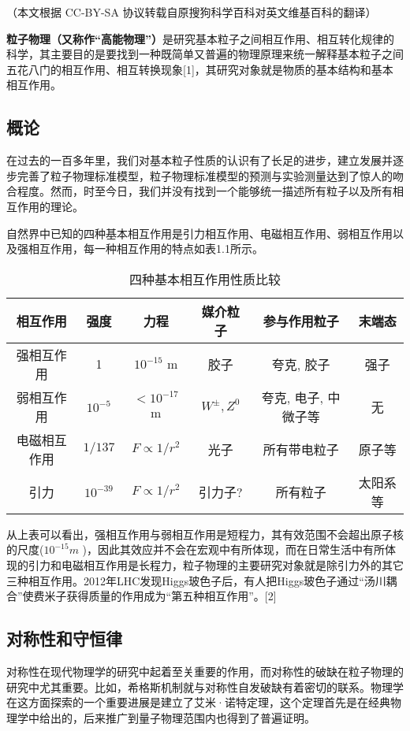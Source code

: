 
（本文根据 CC-BY-SA 协议转载自原搜狗科学百科对英文维基百科的翻译）


\textbf{粒子物理（又称作“高能物理”）}是研究基本粒子之间相互作用、相互转化规律的科学，其主要目的是要找到一种既简单又普遍的物理原理来统一解释基本粒子之间五花八门的相互作用、相互转换现象[1]，其研究对象就是物质的基本结构和基本相互作用。

\subsection{概论}
在过去的一百多年里，我们对基本粒子性质的认识有了长足的进步，建立发展并逐步完善了粒子物理标准模型，粒子物理标准模型的预测与实验测量达到了惊人的吻合程度。然而，时至今日，我们并没有找到一个能够统一描述所有粒子以及所有相互作用的理论。

自然界中已知的四种基本相互作用是引力相互作用、电磁相互作用、弱相互作用以及强相互作用，每一种相互作用的特点如表1.1所示。
\begin{table}[h]
\centering
\caption{四种基本相互作用性质比较}
\begin{tabular}{|c|c|c|c|c|c|}
\hline
\textbf{相互作用} & \textbf{强度} & \textbf{力程} & \textbf{媒介粒子} & \textbf{参与作用粒子} & \textbf{末端态 }\\
\hline
强相互作用 & 1 & $10^{-15}$ m & 胶子 & 夸克, 胶子 & 强子 \\
\hline
弱相互作用 & $10^{-5}$ & $<10^{-17}$ m & $W^{\pm}, Z^0$ & 夸克, 电子, 中微子等 & 无 \\
\hline
电磁相互作用 & $1/137$ & $F \propto 1/r^2$ & 光子 & 所有带电粒子 & 原子等 \\
\hline
引力 & $10^{-39}$ & $F \propto 1/r^2$ & 引力子? & 所有粒子 & 太阳系等 \\
\hline
\end{tabular}
\end{table}
从上表可以看出，强相互作用与弱相互作用是短程力，其有效范围不会超出原子核的尺度($10^{-15} m$ )，因此其效应并不会在宏观中有所体现，而在日常生活中有所体现的引力和电磁相互作用是长程力，粒子物理的主要研究对象就是除引力外的其它三种相互作用。2012年LHC发现Higgs玻色子后，有人把Higgs玻色子通过“汤川耦合”使费米子获得质量的作用成为“第五种相互作用”。[2]

\subsection{ 对称性和守恒律}
对称性在现代物理学的研究中起着至关重要的作用，而对称性的破缺在粒子物理的研究中尤其重要。比如，希格斯机制就与对称性自发破缺有着密切的联系。物理学在这方面探索的一个重要进展是建立了艾米·诺特定理，这个定理首先是在经典物理学中给出的，后来推广到量子物理范围内也得到了普遍证明。

